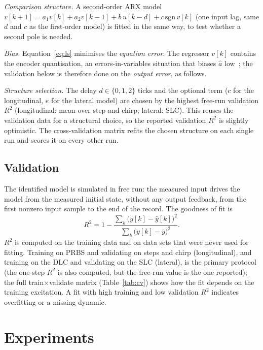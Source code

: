 \documentclass[conference]{IEEEtran}\newcommand{\haveieee}{}%
\begin{document}
\emph{Comparison structure.} A second-order ARX model $v[k{+}1]=a_1v[k]+a_2v[k{-}1]+b\,u[k{-}d]+c\,\mathrm{sgn}\,v[k]$ (one input lag, same $d$ and $c$ as the first-order model) is fitted in the same way, to test whether a second pole is needed.

\emph{Bias.} Equation~\eqref{eq:ls} minimises the \emph{equation error}. The regressor $v[k]$ contains the encoder quantisation, an errors-in-variables situation that biases $\hat a$ low~\cite{ljung1999}; the validation below is therefore done on the \emph{output error}, as follows.

\emph{Structure selection.} The delay $d\in\{0,1,2\}$ ticks and the optional term ($c$ for the longitudinal, $e$ for the lateral model) are chosen by the highest free-run validation $R^2$ (longitudinal: mean over step and chirp; lateral: SLC). This reuses the validation data for a structural choice, so the reported validation $R^2$ is slightly optimistic. The cross-validation matrix refits the chosen structure on each single run and scores it on every other run.

\subsection{Validation}
The identified model is simulated in free run: the measured input drives the model from the measured initial state, without any output feedback, from the first nonzero input sample to the end of the record. The goodness of fit is
\begin{equation}
R^2=1-\frac{\sum_k\big(y[k]-\hat y[k]\big)^2}{\sum_k\big(y[k]-\bar y\big)^2}.
\label{eq:r2}
\end{equation}
$R^2$ is computed on the training data and on data sets that were never used for fitting. Training on PRBS and validating on steps and chirp (longitudinal), and training on the DLC and validating on the SLC (lateral), is the primary protocol (the one-step $R^2$ is also computed, but the free-run value is the one reported); the full train$\times$validate matrix (Table~\ref{tab:cv}) shows how the fit depends on the training excitation. A fit with high training and low validation $R^2$ indicates overfitting or a missing dynamic.

\section{Experiments}
\end{document}
